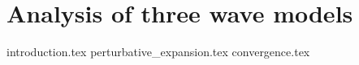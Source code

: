 \chapter{Analysis of three wave models}

{introduction.tex}
{perturbative_expansion.tex}
{convergence.tex}